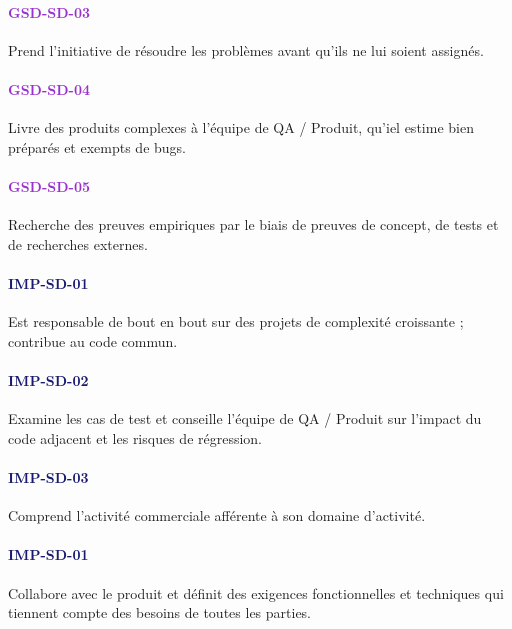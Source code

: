 \documentclass[a4paper, french, openany, 12pt]{book}
\newcommand\str[1]{\textcolor{DarkOrchid}{\textbf{\uppercase{gsd-{#1}}}}}
\newcommand\wis[1]{\textcolor{MidnightBlue}{\textbf{\uppercase{imp-{#1}}}}}
\begin{document}
\begin{multicols}{2}
  \paragraph*{\str{sd-03}}

  Prend l'initiative de résoudre les problèmes avant qu'ils ne lui soient assignés.

  \paragraph*{\str{sd-04}}

  Livre des produits complexes à l'équipe de QA / Produit, qu'iel estime bien préparés et exempts de bugs.

  \paragraph*{\str{sd-05}}

  Recherche des preuves empiriques par le biais de preuves de concept, de tests et de recherches externes.

  \paragraph*{\wis{sd-01}}

  Est responsable de bout en bout sur des projets de complexité croissante ; contribue au code commun.

  \paragraph*{\wis{sd-02}}

  Examine les cas de test et conseille l'équipe de QA / Produit sur l'impact du code adjacent et les risques de
  régression.

  \paragraph*{\wis{sd-03}}

  Comprend l'activité commerciale afférente à son domaine d'activité.

  \paragraph*{\wis{sd-01}}

  Collabore avec le produit et définit des exigences fonctionnelles et techniques
  qui tiennent compte des besoins de toutes les parties.


\end{multicols}
\end{document}
